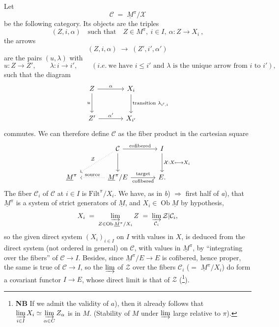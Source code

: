 \documentclass[11pt]{article}
\newcommand{\printedpage}[1]{\marginpar{\footnotesize p.~#1}}
\newcommand{\msp}[1]{\marginpar{\footnotesize [#1]}}
\begin{document}
\printedpage{49}

\msp{page 91}Let
\[ \mathcal{C} \;=\; \underline{M}^\pi/\mathcal{X} \]
be the following category. Its objects are the triples
\[ (Z,i,\alpha) \quad \text{such that} \quad Z\in M^\pi,\ i\in I,\ \alpha : Z\longrightarrow X_i \ , \]
the arrows
\[ (Z,i,\alpha) \;\longrightarrow\; (Z',i',\alpha') \]
are the pairs $(u,\lambda)$ with
\[ u : Z\longrightarrow Z', \qquad \lambda : i\longrightarrow i', \qquad (\textit{i.e.}\ \text{we have } i\le i' \text{ and } \lambda \text{ is the unique arrow from } i \text{ to } i'), \]
such that the diagram
\[
\begin{tikzcd}[row sep=large, column sep=large]
Z \arrow[r,"\alpha"] \arrow[d,"u"'] & X_i \arrow[d,"\text{transition } \lambda_{i',i}"] \\
Z' \arrow[r,"\alpha'"] & X_{i'}
\end{tikzcd}
\]
commutes. We can therefore define $\mathcal{C}$ as the fiber product in the cartesian square
\[
\begin{tikzcd}[row sep=large, column sep=large]
 & \mathcal{C} \arrow[r,"\text{cofibered}"] \arrow[d] \arrow[dl,dotted,"\mathcal{Z}"'] & I \arrow[d,"\mathcal{X} : X \longmapsto X_i"] \\ %
\underline{M}^\pi & \underline{M}^\pi/E \arrow[l,dotted,"\text{source}"'] \arrow[r,"\text{target}","\text{cofibered}"'] & E.
\end{tikzcd}
\]
The fiber $\mathcal{C}_i$ of $\mathcal{C}$ at $i\in I$ is $\mathrm{Filt}^\pi/X_i$. We have, as in \textit{b}) $\Longrightarrow$ first half of \textit{a}), that $\underline{M}^\pi$ is a
\msp{page 92}system of strict generators of $\underline{M}$, and $X_i\in\operatorname{Ob}\underline{M}$ by hypothesis,
\[ X_i \;=\; \varinjlim_{Z\in\operatorname{Ob}\underline{M}^\pi/X_i} Z \;=\; \varinjlim_{\mathcal{C}_i}\mathcal{Z}|\mathcal{C}_i, \]
so the given direct system $(X_i)_{i\in I}$ on $I$ with values in $X$, is deduced from the direct system (not ordered in general) on $\mathcal{C}$, with values in $\underline{M}^\pi$, by ``integrating over the fibers'' of $\mathcal{C}\longrightarrow I$. Besides, since $\underline{M}^\pi/E\longrightarrow E$ is cofibered, hence proper, the same is true of $\mathcal{C}\longrightarrow I$, so the $\varinjlim$ of $\mathcal{Z}$ over the fibers $\mathcal{C}_i$ ($=$ $\underline{M}^\pi/X_i$) do form a covariant functor $I\longrightarrow E$, whose direct limit is that of $\mathcal{Z}$ (\footnote[43]{\textbf{NB} If we admit the validity of $a$), then it already follows that $\varinjlim\limits_{i\in I} X_i \simeq \varinjlim\limits_{\alpha\in C} Z_\alpha$ is in $M$. (Stability of $M$ under $\varinjlim$ large relative to $\pi$).}).
\end{document}
